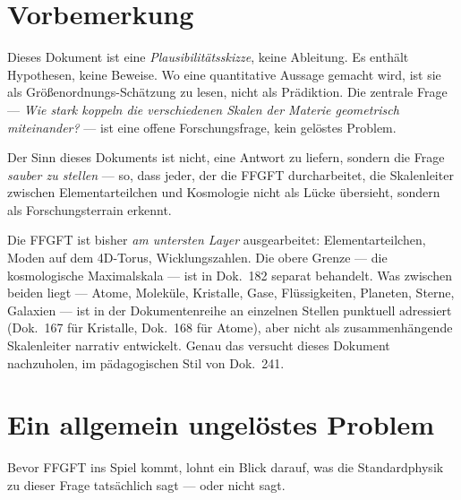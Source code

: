 
\section*{Vorbemerkung}

Dieses Dokument ist eine \emph{Plausibilitätsskizze}, keine Ableitung.
Es enthält Hypothesen, keine Beweise. Wo eine quantitative Aussage
gemacht wird, ist sie als Größenordnungs-Schätzung zu lesen, nicht als
Prädiktion. Die zentrale Frage --- \emph{Wie stark koppeln die
verschiedenen Skalen der Materie geometrisch miteinander?} --- ist eine
offene Forschungsfrage, kein gelöstes Problem.

Der Sinn dieses Dokuments ist nicht, eine Antwort zu liefern, sondern
die Frage \emph{sauber zu stellen} --- so, dass jeder, der die FFGFT
durcharbeitet, die Skalenleiter zwischen Elementarteilchen und
Kosmologie nicht als Lücke übersieht, sondern als Forschungsterrain
erkennt.

Die FFGFT ist bisher \emph{am untersten Layer} ausgearbeitet:
Elementarteilchen, Moden auf dem 4D-Torus, Wicklungszahlen. Die obere
Grenze --- die kosmologische Maximalskala --- ist in Dok.~182 separat
behandelt. Was zwischen beiden liegt --- Atome, Moleküle, Kristalle,
Gase, Flüssigkeiten, Planeten, Sterne, Galaxien --- ist in der
Dokumentenreihe an einzelnen Stellen punktuell adressiert (Dok.~167
für Kristalle, Dok.~168 für Atome), aber nicht als zusammenhängende
Skalenleiter narrativ entwickelt. Genau das versucht dieses Dokument
nachzuholen, im pädagogischen Stil von Dok.~241.

\section{Ein allgemein ungelöstes Problem}

Bevor FFGFT ins Spiel kommt, lohnt ein Blick darauf, was die
Standardphysik zu dieser Frage tatsächlich sagt --- oder nicht sagt.

